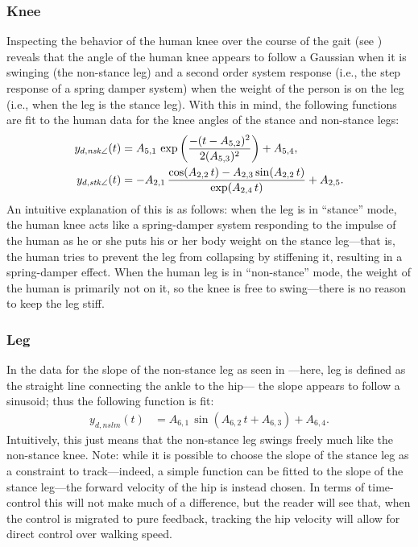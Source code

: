 \subsubsection{Knee} Inspecting the behavior of the human knee over the course of the gait (see ) reveals that the angle of the human knee appears to follow a Gaussian when it is swinging (the non-stance leg) and a second order system response (i.e., the step response of a spring damper system) when the weight of the person is on the leg (i.e., when the leg is the stance leg). With this in mind, the following functions are fit to the human data for the knee angles of the stance and non-stance legs:
\begin{align}
  y_{d,\mathit{nsk}\angle}(t) &= A_{5,1} \, \exp\left(\frac{-(t-A_{5,2})^2}{2 (A_{5,3})^2}\right) + A_{5,4},\\
  y_{d,\mathit{stk}\angle}(t) &= -A_{2,1} \, \frac{\cos(A_{2,2}\,t)-A_{2,3} \sin(A_{2,2}\,t)}{\exp(A_{2,4} \, t)} + A_{2,5}.
\end{align}
An intuitive explanation of this is as follows: when the leg is in ``stance'' mode, the human knee acts like a spring-damper system responding to the impulse of the human as he or she puts his or her body weight on the stance leg---that is, the human tries to prevent the leg from collapsing by stiffening it, resulting in a spring-damper effect. When the human leg is in ``non-stance'' mode, the weight of the human is primarily not on it, so the knee is free to swing---there is no reason to keep the leg stiff.

\subsubsection{Leg} In the data for the slope of the non-stance leg as seen in ---here, leg is defined as the straight line connecting the ankle to the hip--- the slope appears to follow a sinusoid; thus the following function is fit:
\begin{align}
  y_{d,nslm}(t) &= A_{6,1} \, \sin(A_{6,2} \, t + A_{6,3}) + A_{6,4}.
\end{align}
Intuitively, this just means that the non-stance leg swings freely much like the non-stance knee. Note: while it is possible to choose the slope of the stance leg as a constraint to track---indeed, a simple function can be fitted to the slope of the stance leg---the forward velocity of the hip is instead chosen. In terms of time-control this will not make much of a difference, but the reader will see that, when the control is migrated to pure feedback, tracking the hip velocity will allow for direct control over walking speed.

